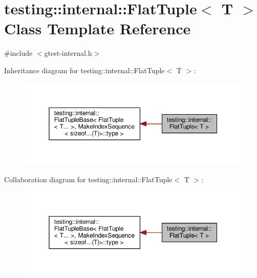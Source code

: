 \hypertarget{classtesting_1_1internal_1_1FlatTuple}{}\section{testing\+:\+:internal\+:\+:Flat\+Tuple$<$ T $>$ Class Template Reference}
\label{classtesting_1_1internal_1_1FlatTuple}


{\ttfamily \#include $<$gtest-\/internal.\+h$>$}



Inheritance diagram for testing\+:\+:internal\+:\+:Flat\+Tuple$<$ T $>$\+:\nopagebreak
\begin{figure}[H]
\begin{center}
\leavevmode
\includegraphics[width=350pt]{classtesting_1_1internal_1_1FlatTuple__inherit__graph}
\end{center}
\end{figure}


Collaboration diagram for testing\+:\+:internal\+:\+:Flat\+Tuple$<$ T $>$\+:\nopagebreak
\begin{figure}[H]
\begin{center}
\leavevmode
\includegraphics[width=350pt]{classtesting_1_1internal_1_1FlatTuple__coll__graph}
\end{center}
\end{figure}
